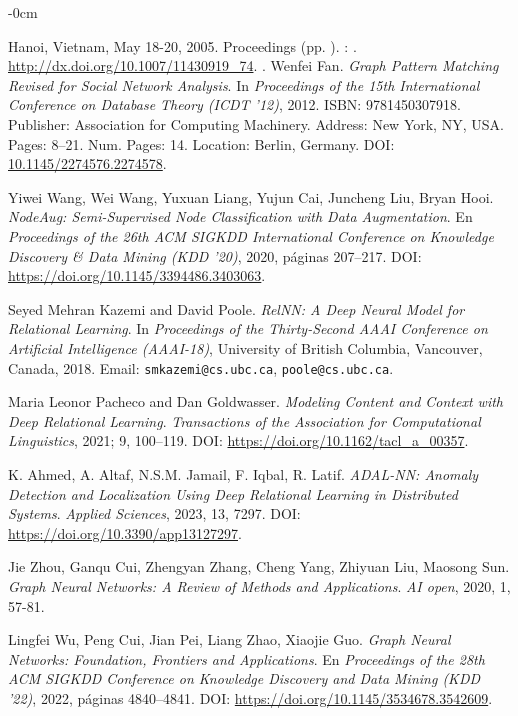 \documentclass{article}%
\begin{document}
\begin{adjustwidth}{-\extralength}{0cm}
\begin{thebibliography}{31}
{{{  Hanoi, Vietnam, May 18-20, 2005. Proceedings}\/} (pp.
  ).
\newblock {}: .
\newblock \URLprefix \url{http://dx.doi.org/10.1007/11430919_74}.
  \DOIprefix{}.
Wenfei Fan.
\emph{Graph Pattern Matching Revised for Social Network Analysis}.
In \emph{Proceedings of the 15th International Conference on Database Theory (ICDT '12)}, 2012.
ISBN: 9781450307918.
Publisher: Association for Computing Machinery.
Address: New York, NY, USA.
Pages: 8--21.
Num. Pages: 14.
Location: Berlin, Germany.
DOI: \href{https://doi.org/10.1145/2274576.2274578}{10.1145/2274576.2274578}.

Yiwei Wang, Wei Wang, Yuxuan Liang, Yujun Cai, Juncheng Liu, Bryan Hooi.
\emph{NodeAug: Semi-Supervised Node Classification with Data Augmentation}.
En \emph{Proceedings of the 26th ACM SIGKDD International Conference on Knowledge Discovery \& Data Mining (KDD '20)}, 2020, páginas 207–217.
DOI: \url{https://doi.org/10.1145/3394486.3403063}.


Seyed Mehran Kazemi and David Poole.
\emph{RelNN: A Deep Neural Model for Relational Learning}.
In \emph{Proceedings of the Thirty-Second AAAI Conference on Artificial Intelligence (AAAI-18)}, University of British Columbia, Vancouver, Canada, 2018.
Email: \texttt{smkazemi@cs.ubc.ca}, \texttt{poole@cs.ubc.ca}.

Maria Leonor Pacheco and Dan Goldwasser.
\emph{Modeling Content and Context with Deep Relational Learning}.
\emph{Transactions of the Association for Computational Linguistics}, 2021; 9, 100–119.
DOI: \url{https://doi.org/10.1162/tacl_a_00357}.

K. Ahmed, A. Altaf, N.S.M. Jamail, F. Iqbal, R. Latif.
\emph{ADAL-NN: Anomaly Detection and Localization Using Deep Relational Learning in Distributed Systems}.
\emph{Applied Sciences}, 2023, 13, 7297.
DOI: \url{https://doi.org/10.3390/app13127297}.

Jie Zhou, Ganqu Cui, Zhengyan Zhang, Cheng Yang, Zhiyuan Liu, Maosong Sun.
\emph{Graph Neural Networks: A Review of Methods and Applications}.
\emph{AI open}, 2020, 1, 57-81.

Lingfei Wu, Peng Cui, Jian Pei, Liang Zhao, Xiaojie Guo.
\emph{Graph Neural Networks: Foundation, Frontiers and Applications}.
En \emph{Proceedings of the 28th ACM SIGKDD Conference on Knowledge Discovery and Data Mining (KDD '22)}, 2022, páginas 4840–4841.
DOI: \url{https://doi.org/10.1145/3534678.3542609}.

}
\end{thebibliography}
\end{adjustwidth}
\end{document}
